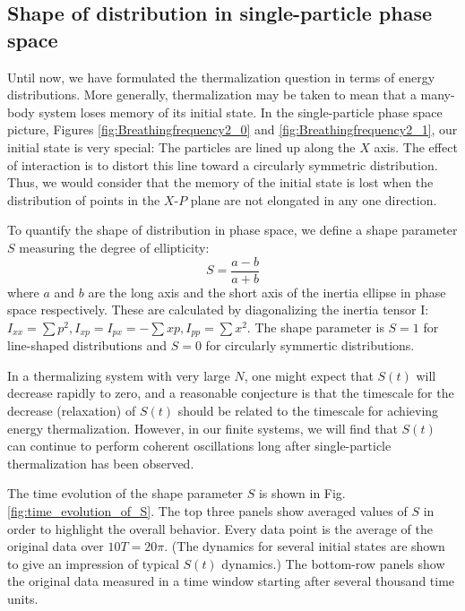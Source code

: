 \documentclass[a4paper, onecolumn]{revtex4-1}
\begin{document}
\subsection{Shape of distribution in single-particle phase space}\label{section:Shape}

Until now, we have formulated the thermalization question in terms of energy distributions.  More
generally, thermalization may be taken to mean that a many-body system loses memory of its initial
state.  In the single-particle phase space picture, Figures \ref{fig:Breathingfrequency2_0} and
\ref{fig:Breathingfrequency2_1}, our initial state is very special: The particles are lined up along
the $X$ axis.  The effect of interaction is to distort this line toward a circularly symmetric
distribution.  Thus, we would consider that the memory of the initial state is lost when the
distribution of points in the $X$-$P$ plane are not elongated in any one direction.

To quantify the shape of distribution in phase space, we define a shape parameter $S$ measuring the
degree of ellipticity:
\begin{equation}
S=\frac{a-b}{a+b}
\end{equation}
where $a$ and $b$ are the long axis and the short axis of the inertia ellipse in phase space
respectively.  These are calculated by diagonalizing the inertia tensor I: $I_{xx}=\sum{p^2},
I_{xp}=I_{px}=-\sum{xp},I_{pp}=\sum{x^2}$.  The shape parameter is $S=1$ for line-shaped
distributions and $S=0$ for circularly symmertic distributions.  

In a thermalizing system with very large $N$, one might expect that $S(t)$ will decrease rapidly to
zero, and a reasonable conjecture is that the timescale for the decrease (relaxation) of $S(t)$
should be related to the timescale for achieving energy thermalization.  However, in our finite
systems, we will find that $S(t)$ can continue to perform coherent oscillations long after
single-particle thermalization has been observed.


The time evolution of the shape parameter $S$ is shown in Fig.\ref{fig:time_evolution_of_S}.
%
The top three panels show averaged values of $S$ in order to highlight the overall behavior.  Every
data point is the average of the original data over $10T = 20\pi$.  (The dynamics for several
initial states are shown to give an impression of typical $S(t)$ dynamics.)  The bottom-row panels
show the original data measured in a time window starting after several thousand time units.
\end{document}
